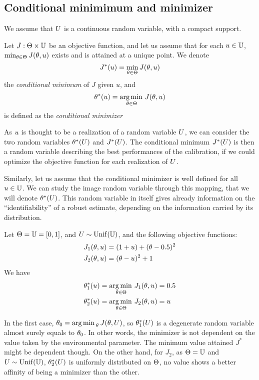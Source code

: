\documentclass[../../Main_ManuscritThese.tex]{subfiles}
\begin{document}
\subsection{Conditional minimimum and minimizer}
\label{sec:MPE}
We assume that $U$ is a continuous random variable, with a compact support. 
\begin{definition}
  Let $J: \Theta \times \mathbb{U}$ be an objective function, and let us assume that for each $u \in \mathbb{U}$, $\min_{\theta \in \Theta} J(\theta,u)$ exists and is attained at a unique point.
  We denote
  \begin{equation}
    J^*(u) = \min_{\theta \in \Theta} J(\theta,u)
  \end{equation}
  the \emph{conditional minimum} of $J$ given $u$, and
  \begin{equation}
    \label{eq:def_kstar}
    \theta^*(u) = \operatorname*{arg\,min \,}_{\theta\in\Theta} J(\theta, u)
  \end{equation}
 is defined as the \emph{conditional minimizer}
\end{definition}
As $u$ is thought to be a realization of a random variable $U$, we can consider the two random variables $\theta^*(U)$ and $J^*(U)$.
The conditional minimum $J^*(U)$ is then a random variable describing the best performances of the calibration, if we could optimize the objective function for each realization of $U$.

Similarly, let us assume that the conditional minimizer is well defined for all $u\in \mathbb{U}$. We can study the image random variable through this mapping, that we will denote $\theta^*(U)$.
This random variable in itself gives already information on the ``identifiability'' of a robust estimate, depending on the information carried by its distribution.
\begin{example}
Let $\Theta = \mathbb{U}= [0, 1]$, and $U \sim \mathrm{Unif}(\mathbb{U})$, and the following objective functions:
\begin{align}
  J_1(\theta, u) &= (1+u)+(\theta - 0.5)^2\\
  J_2(\theta, u) &= (\theta-u)^2 + 1
\end{align}
We have
\begin{align}
  \theta^*_1(u) &= \operatorname*{arg\,min \,}_{\theta \in \Theta} J_1(\theta, u) = 0.5 \\
  \theta^*_2(u) &= \operatorname*{arg\,min \,}_{\theta\in\Theta} J_2(\theta, u) = u
\end{align}

In the first case, $\theta_0 = \operatorname*{arg\,min \,}_{\theta} J(\theta, U)$, so $\theta_1^*(U)$ is a degenerate random variable almost surely equals to  $\theta_0$. In other words, the minimizer is not dependent on the value taken by the environmental parameter. The minimum value attained $J^*$ might be dependent though. On the other hand, for $J_2$, as $\Theta=\mathbb{U}$ and $U \sim \mathrm{Unif}(\mathbb{U})$, $\theta_2^*(U)$ is uniformly distributed on $\Theta$, no value shows a better affinity of being a minimizer than the other.
\end{example}
\end{document}
